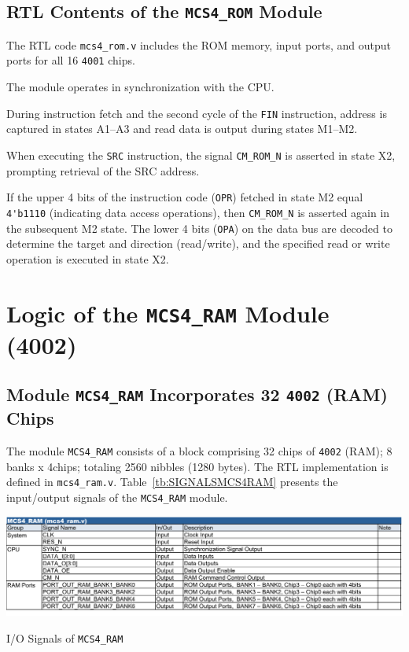 \subsection{\textbf{RTL Contents of the \texttt{MCS4\_ROM} Module}}
The RTL code \texttt{mcs4\_rom.v} includes the ROM memory, input ports, and output ports for all 16 \texttt{4001} chips.  

The module operates in synchronization with the CPU.

During instruction fetch and the second cycle of the \texttt{FIN} instruction,  
address is captured in states A1–A3 and read data is output during states M1–M2.

When executing the \texttt{SRC} instruction, the signal \verb|CM_ROM_N| is asserted in state X2, prompting retrieval of the SRC address.

If the upper 4 bits of the instruction code (\texttt{OPR}) fetched in state M2 equal \verb|4'b1110| (indicating data access operations), then \verb|CM_ROM_N| is asserted again in the subsequent M2 state.  
The lower 4 bits (\texttt{OPA}) on the data bus are decoded to determine the target and direction (read/write), and the specified read or write operation is executed in state X2.

\section{Logic of the \texttt{MCS4\_RAM} Module (4002)}
\subsection{\textbf{Module \texttt{MCS4\_RAM} Incorporates 32 \texttt{4002} (RAM) Chips}}
The module \texttt{MCS4\_RAM} consists of a block comprising 32 chips of \texttt{4002} (RAM); 8 banks x 4chips; totaling 2560 nibbles (1280 bytes).
The RTL implementation is defined in \texttt{mcs4\_ram.v}.  
Table~\ref{tb:SIGNALSMCS4RAM} presents the input/output signals of the \texttt{MCS4\_RAM} module.

\begin{table}[htbp]
    \includegraphics[width=1.00\columnwidth]{./Table/SignalsMCS4RAM.png}
    \caption{I/O Signals of \texttt{MCS4\_RAM}}
    \label{tb:SIGNALSMCS4RAM}
\end{table}

